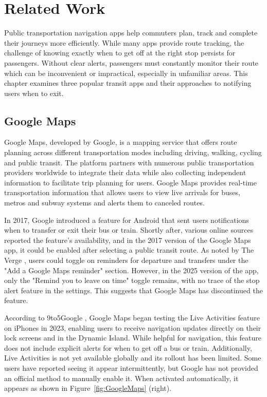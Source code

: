 \chapter{Related Work}
\label{cha:RelatedWork}

Public transportation navigation apps help commuters plan, track and complete their journeys more efficiently. 
While many apps provide route tracking, the challenge of knowing exactly when to get off at the right stop persists for passengers.
Without clear alerts, passengers must constantly monitor their route which can be inconvenient or impractical, especially in unfamiliar areas.
This chapter examines three popular transit apps and their approaches to notifying users when to exit.

\section{Google Maps}
Google Maps, developed by Google, is a mapping service that offers route planning across different transportation modes including driving, walking, cycling and public transit. 
The platform partners with numerous public transportation providers worldwide to integrate their data while also collecting independent information to facilitate trip planning for users.
Google Maps provides real-time transportation information that allows users to view live arrivals for buses, metros and subway systems and alerts them to canceled routes.

In 2017, Google introduced a feature for Android that sent users notifications when to transfer or exit their bus or train.
Shortly after, various online sources reported the feature's availability, and in the 2017 version of the Google Maps app, it could be enabled after selecting a public transit route.
As noted by The Verge \cite{verge_google_maps_2017}, users could toggle on reminders for departure and transfers under the "Add a Google Maps reminder" section.
However, in the 2025 version of the app, only the "Remind you to leave on time" toggle remains, with no trace of the stop alert feature in the settings.
This suggests that Google Maps has discontinued the feature.

According to 9to5Google \cite{google_maps_live_activity}, Google Maps began testing the Live Activities feature on iPhones in 2023, enabling users to receive navigation updates directly on their lock screens and in the Dynamic Island.
While helpful for navigation, this feature does not include explicit alerts for when to get off a bus or train.
Additionally, Live Activities is not yet available globally and its rollout has been limited.
Some users have reported seeing it appear intermittently, but Google has not provided an official method to manually enable it.
When activated automatically, it appears as shown in Figure~\ref{fig:GoogleMaps} (right).

